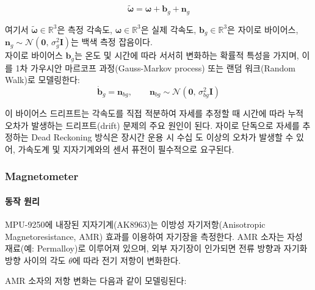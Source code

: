                 \begin{equation}
                    \tilde{\boldsymbol{\omega}} = \boldsymbol{\omega} + \mathbf{b}_g + \mathbf{n}_g
                    \label{eq:gyro_model}
                \end{equation}

                \noindent 여기서 $\tilde{\boldsymbol{\omega}} \in \mathbb{R}^3$은 측정 각속도, $\boldsymbol{\omega} \in \mathbb{R}^3$은 실제 각속도, $\mathbf{b}_g \in \mathbb{R}^3$은 자이로 바이어스, $\mathbf{n}_g \sim \mathcal{N}(\mathbf{0},\, \sigma_g^2 \mathbf{I})$는 백색 측정 잡음이다.\\

                자이로 바이어스 $\mathbf{b}_g$는 온도 및 시간에 따라 서서히 변화하는 확률적 특성을 가지며, 이를 1차 가우시안 마르코프 과정(Gauss-Markov process) 또는 랜덤 워크(Random Walk)로 모델링한다:\\

                \begin{equation}
                    \dot{\mathbf{b}}_g = \mathbf{n}_{bg}, \qquad \mathbf{n}_{bg} \sim \mathcal{N}(\mathbf{0},\, \sigma_{bg}^2 \mathbf{I})
                    \label{eq:gyro_bias_rw}
                \end{equation}

                이 바이어스 드리프트는 각속도를 직접 적분하여 자세를 추정할 때 시간에 따라 누적 오차가 발생하는 드리프트(drift) 문제의 주요 원인이 된다. 자이로 단독으로 자세를 추정하는 Dead Reckoning 방식은 장시간 운용 시 수십 도 이상의 오차가 발생할 수 있어, 가속도계 및 지자기계와의 센서 퓨전이 필수적으로 요구된다.\\

        \subsubsection{Magnetometer}
            \paragraph{동작 원리}
                MPU-9250에 내장된 지자기계(AK8963)는 이방성 자기저항(Anisotropic Magnetoresistance, AMR)
                효과를 이용하여 자기장을 측정한다.
                AMR 소자는 자성 재료(예: Permalloy)로 이루어져 있으며,
                외부 자기장이 인가되면 전류 방향과 자기화 방향 사이의 각도 $\theta$에 따라 전기 저항이 변화한다.

                AMR 소자의 저항 변화는 다음과 같이 모델링된다:

